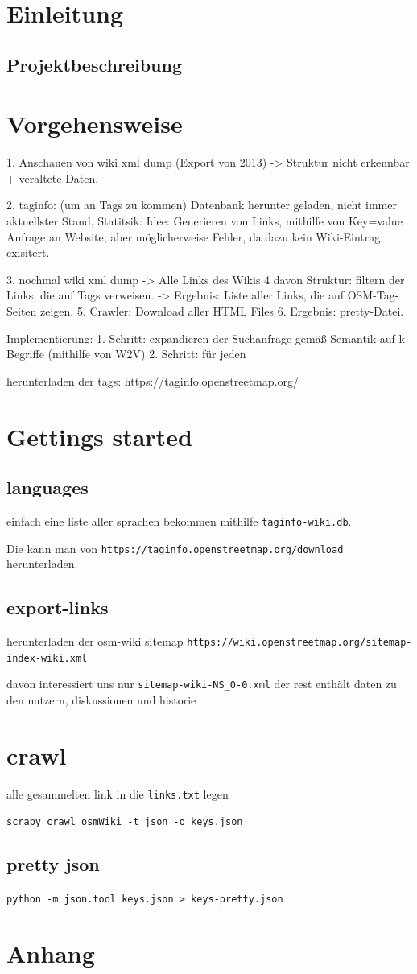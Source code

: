 \documentclass[12pt,pdftex,a4paper]{article}
\begin{document}
\section{Einleitung}
\subsection{Projektbeschreibung}

\pagebreak
\section{Vorgehensweise}

1. Anschauen von wiki xml dump (Export von 2013) 
-> Struktur nicht erkennbar + veraltete Daten.

2. taginfo: (um an Tags zu kommen) Datenbank herunter geladen, nicht immer aktuellster Stand, Statitsik: Idee: Generieren von Links, mithilfe von Key=value Anfrage an Website, aber möglicherweise Fehler, da dazu kein Wiki-Eintrag exisitert.

3. nochmal wiki xml dump -> Alle Links des Wikis
4  davon Struktur: filtern der Links, die auf Tags verweisen.
-> Ergebnis: Liste aller Links, die auf OSM-Tag-Seiten zeigen.
5. Crawler: Download aller HTML Files
6. Ergebnis: pretty-Datei.

Implementierung:
1. Schritt: expandieren der Suchanfrage gemäß Semantik auf k Begriffe (mithilfe von W2V) 
2. Schritt: für jeden 


herunterladen der tags: https://taginfo.openstreetmap.org/

\section{Gettings started}
\subsection{languages}
einfach eine liste aller sprachen bekommen mithilfe \texttt{taginfo-wiki.db}.

Die kann man von \texttt{https://taginfo.openstreetmap.org/download} herunterladen.

\subsection{export-links}
herunterladen der osm-wiki sitemap
\texttt{https://wiki.openstreetmap.org/sitemap-index-wiki.xml}


davon interessiert uns nur \texttt{sitemap-wiki-NS\_0-0.xml} der rest enthält daten zu den nutzern, diskussionen und historie

\section{crawl}
alle gesammelten link in die \texttt{links.txt} legen

\texttt{scrapy crawl osmWiki -t json -o keys.json}

\subsection{pretty json}
\texttt{python -m json.tool keys.json > keys-pretty.json}


\pagebreak
\section{Anhang}




\end{document}
